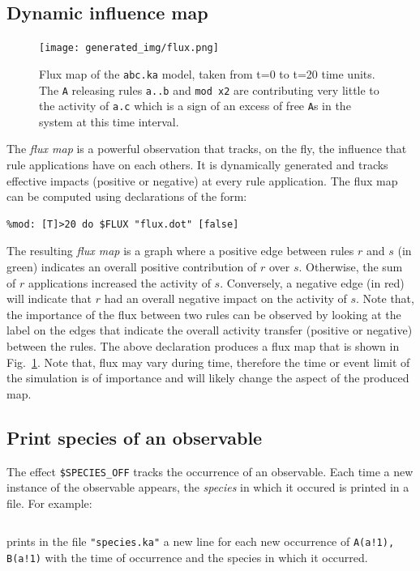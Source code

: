 \documentclass[11pt]{book}
\def\ttt#1{\texttt{#1}}
\begin{document}
\subsection{Dynamic influence map}

\begin{figure}[p] %
   \centering
\texttt{[image: generated\_img/flux.png]}
   \caption{Flux map of the \ttt{abc.ka} model, taken from t=0 to t=20 time units. The \ttt{A} releasing rules \ttt{a..b} and \ttt{mod x2} are contributing very little to the activity of \ttt{a.c} which is a sign of an excess of free \ttt{A}s in the system at this time interval.}
   \label{fig:flux}
\end{figure}
The \emph{flux map} is a powerful observation that tracks, on the fly, the influence that rule applications have on each others. It is dynamically generated and tracks effective impacts (positive or negative) at every rule application. The flux map can be computed using declarations of the form:
\begin{lstlisting}[language=kappa]
%mod: [true] do $FLUX "flux.dot" [true]
%mod: [T]>20 do $FLUX "flux.dot" [false]
\end{lstlisting}
The resulting \emph{flux map} is a graph where a positive edge between rules $r$ and $s$ (in green) indicates an overall positive contribution of $r$ over $s$. Otherwise, the sum of $r$ applications increased the activity of $s$. Conversely, a negative edge (in red) will indicate that $r$ had an overall negative impact on the activity of $s$. Note that, the importance of the flux between two rules can be observed by looking at the label on the edges that indicate the overall activity transfer (positive or negative) between the rules. The above declaration produces a flux map that is shown in  Fig.~\ref{fig:flux}. Note that, flux may vary during time, therefore the time or event limit of the simulation is of importance and will likely change the aspect of the produced map.

\subsection{Print species of an observable}
The effect \ttt{\$SPECIES\_OFF} tracks the occurrence of an observable. Each time a new instance of the observable appears, the \emph{species} in which it occured is printed in a file. For example:
{\begin{lstlisting}[language=kappa]
%mod:$SPECIES_OF "species.ka" A(a!1), B(a!1) [true]
\end{lstlisting}}
prints in the file \ttt{"species.ka"} a new line for each new occurrence of \ttt{A(a!1), B(a!1)} with the time of occurrence and the species in which it occurred.
\end{document}
